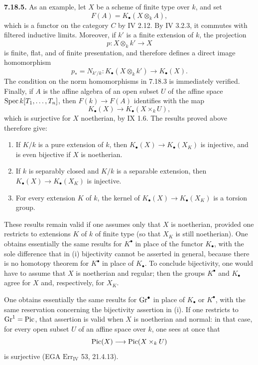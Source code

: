 \textbf{7.18.5.}
As an example, let $X$ be a scheme of finite type over $k$, and set
\[
F(A)=K_\bullet(X\otimes_k A),
\]
which is a functor on the category $C$ by IV 2.12. By IV 3.2.3, it commutes
with filtered inductive limits. Moreover, if $k'$ is a finite extension of
$k$, the projection
\[
p:X\otimes_k k'\longrightarrow X
\]
is finite, flat, and of finite presentation, and therefore defines a direct
image homomorphism
\[
p_*=N_{k'/k}:K_\bullet(X\otimes_k k')\longrightarrow K_\bullet(X).
\]
The condition on the norm homomorphisms in 7.18.3 is immediately verified.
Finally, if $A$ is the affine algebra of an open subset $U$ of the affine
space $\operatorname{Spec} k[T_1,\ldots,T_n]$, then $F(k)\to F(A)$ identifies with the map
\[
K_\bullet(X)\longrightarrow K_\bullet(X\times_k U),
\]
which is surjective for $X$ noetherian, by IX 1.6. The results proved above
therefore give:
\begin{enumerate}[label=(\roman*)]
\item If $K/k$ is a pure extension of $k$, then
  $K_\bullet(X)\to K_\bullet(X_K)$ is injective, and is even bijective if
  $X$ is noetherian.
\item If $k$ is separably closed and $K/k$ is a separable extension, then
  $K_\bullet(X)\to K_\bullet(X_K)$ is injective.
\item For every extension $K$ of $k$, the kernel of
  $K_\bullet(X)\to K_\bullet(X_K)$ is a torsion group.
\end{enumerate}
These results remain valid if one assumes only that $X$ is noetherian,
provided one restricts to extensions $K$ of $k$ of finite type (so that
$X_K$ is still noetherian). One obtains essentially the same results for
$K^\bullet$ in place of the functor $K_\bullet$, with the sole difference
that in (i) bijectivity cannot be asserted in general, because there is no
homotopy theorem for $K^\bullet$ in place of $K_\bullet$. To conclude
bijectivity, one would have to assume that $X$ is noetherian and regular;
then the groups $K^\bullet$ and $K_\bullet$ agree for $X$ and, respectively,
for $X_K$.

One obtains essentially the same results for $\operatorname{Gr}^\bullet$ in place of
$K_\bullet$ or $K^\bullet$, with the same reservation concerning the
bijectivity assertion in (i). If one restricts to $\operatorname{Gr}^1=\operatorname{Pic}$, that
assertion is valid when $X$ is noetherian and normal: in that case, for every
open subset $U$ of an affine space over $k$, one sees at once that
\[
\operatorname{Pic}(X)\longrightarrow\operatorname{Pic}(X\times_k U)
\]
is surjective (EGA $\mathrm{Err}_{\mathrm{IV}}$ 53, 21.4.13).

